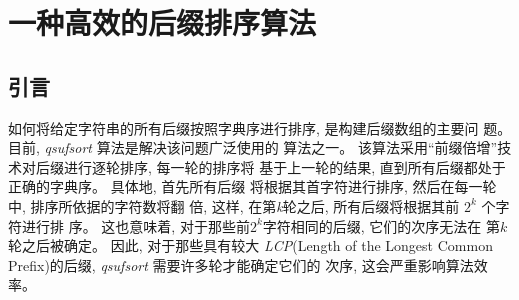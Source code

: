 

\chapter{一种高效的后缀排序算法}
\label{chap:SS}


\section{引言}
\label{sec:3_introduction}

如何将给定字符串的所有后缀按照字典序进行排序, 是构建后缀数组的主要问
题。 目前, \emph{qsufsort}\cite{Larsson2007} 算法是解决该问题广泛使用的
算法之一。 该算法采用“前缀倍增”技术对后缀进行逐轮排序, 每一轮的排序将
基于上一轮的结果, 直到所有后缀都处于正确的字典序。 具体地, 首先所有后缀
将根据其首字符进行排序, 然后在每一轮中, 排序所依据的字符数将翻
倍, 这样, 在第\emph{k}轮之后, 所有后缀将根据其前 $2^{k}$ 个字符进行排
序。 这也意味着, 对于那些前$2^{k}$字符相同的后缀, 它们的次序无法在
第$k$轮之后被确定。 因此, 对于那些具有较大 \emph{LCP}(Length of the
Longest Common Prefix)的后缀, \emph{qsufsort} 需要许多轮才能确定它们的
次序, 这会严重影响算法效率。

